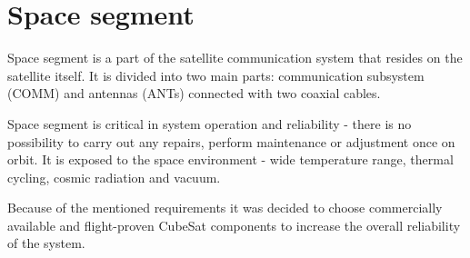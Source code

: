 






\chapter{Space segment}
Space segment is a part of the satellite communication system that resides on the satellite itself. It is divided into two main parts: communication subsystem (COMM) and antennas (ANTs) connected with two coaxial cables.

Space segment is critical in system operation and reliability - there is no possibility to carry out any repairs, perform maintenance or adjustment once on orbit. It is exposed to the space environment - wide temperature range, thermal cycling, cosmic radiation and vacuum.

Because of the mentioned requirements it was decided to choose commercially available and flight-proven CubeSat components to increase the overall reliability of the system.


